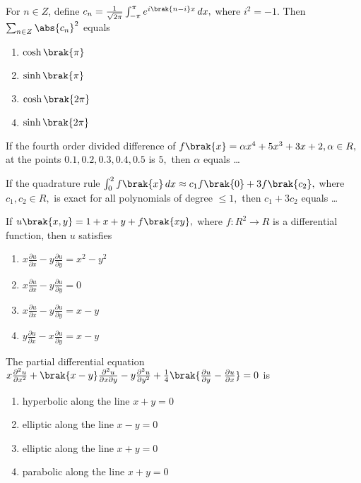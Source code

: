  \iffalse
\chapter{2017}
\author{EE24BTECH11021 - Eshan Ray}
\section{ma}
\fi

    \item For $n\in Z$, define $c_n=\frac{1}{\sqrt{2\pi}}\int_{-\pi}^{\pi}e^{i\brak{n-i}x}\,dx,$ where $i^2=-1$. Then $\sum_{n\in Z}\abs{c_n}^2$ equals 
    \begin{enumerate}
        \item  $\cosh\brak{\pi}$
        \item $\sinh\brak{\pi}$
        \item $\cosh\brak{2\pi}$
        \item $\sinh\brak{2\pi}$
    \end{enumerate}
    \item If the fourth order divided difference of $f\brak{x}=\alpha x^4+5x^3+3x+2,\alpha\in R,$ at the points $0.1,0.2,0.3,0.4,0.5$ is $5,$ then $\alpha$ equals \dots
    \item If the quadrature rule $\int_{0}^{2}f\brak{x}\,dx\approx c_1 f\brak{0}+3f\brak{c_2},$ where $c_1,c_2\in R,$ is exact for all polynomials of degree $\leq 1,$ then $c_1+3c_2$ equals \dots
    \item If $u\brak{x,y}=1+x+y+f\brak{xy},$ where $f\colon R^2\to R$ is a differential function, then $u$ satisfies
    \begin{enumerate}
        \item $x\frac{\partial u}{\partial x}-y\frac{\partial u}{\partial y}=x^2-y^2$
        \item $x\frac{\partial u}{\partial x}-y\frac{\partial u}{\partial y}=0$
        \item $x\frac{\partial u}{\partial x}-y\frac{\partial u}{\partial y}=x-y$
        \item $y\frac{\partial u}{\partial x}-x\frac{\partial u}{\partial y}=x-y$
    \end{enumerate}
    \item The partial differential equation $x\frac{\partial^2 u}{\partial x^2}+\brak{x-y}\frac{\partial^2 u}{\partial x\partial y}-y\frac{\partial^2 u}{\partial y^2}+\frac{1}{4}\brak{\frac{\partial u}{\partial y}-\frac{\partial u}{\partial x}}=0$ is
    \begin{enumerate}
        \item hyperbolic along the line $x+y=0$
        \item elliptic along the line $x-y=0$
        \item elliptic along the line $x+y=0$
        \item parabolic along the line $x+y=0$
    \end{enumerate}
